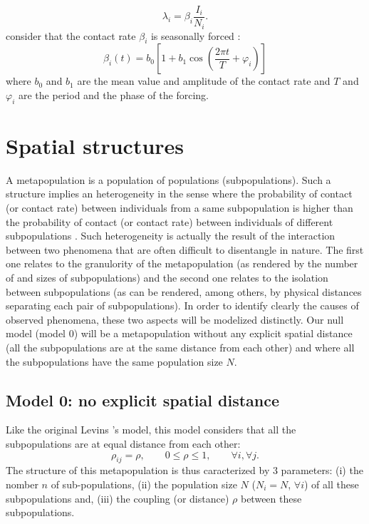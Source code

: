 \documentclass[a4paper,10pt]{article}
\begin{document}
\begin{equation}
  \lambda_i = \beta_i\frac{I_i}{N_i}.
\end{equation}
consider that the contact rate $\beta_i$ is seasonally forced \cite{Altizer2006}:
\begin{equation} \label{eq:beta_i}
  \beta_i(t) = b_0\left[1+b_1\cos\left(\frac{2\pi t}{T}+\varphi_i\right)\right]
\end{equation}
where $b_0$ and $b_1$ are the mean value and amplitude of the contact rate and $T$ and $\varphi_i$ are the period and the phase of the forcing.

\section{Spatial structures}
A metapopulation is a population of populations (subpopulations). Such a structure implies an heterogeneity in the sense where the probability of contact (or contact rate) between individuals from a same subpopulation is higher than the probability of contact (or contact rate) between individuals of different subpopulations \cite{Hanski2004}. Such heterogeneity is actually the result of the interaction between two phenomena that are often difficult to disentangle in nature. The first one relates to the granulority of the metapopulation (as rendered by the number of and sizes of subpopulations) and the second one relates to the isolation between subpopulations (as can be rendered, among others, by physical distances separating each pair of subpopulations). In order to identify clearly the causes of observed phenomena, these two aspects will be modelized distinctly. Our null model (model 0) will be a metapopulation without any explicit spatial distance (all the subpopulations are at the same distance from each other) and where all the subpopulations have the same population size $N$.

\subsection{Model 0: no explicit spatial distance}
Like the original Levins \cite{Levins1969}'s model, this model considers that all the subpopulations are at equal distance from each other:
\begin{equation}
  \rho_{ij} = \rho, \qquad 0\leqslant\rho\leqslant 1, \qquad \forall i, \forall j.
\end{equation}
The structure of this metapopulation is thus caracterized by 3 parameters: (i) the nomber $n$ of sub-populations, (ii) the population size $N$ ($N_i=N$, $\forall i$) of all these subpopulations and, (iii) the coupling (or distance) $\rho$ between these subpopulations.
\end{document}
